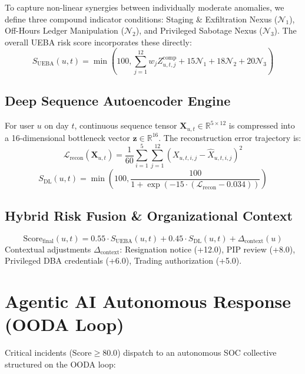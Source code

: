 \documentclass[conference]{IEEEtran}
\begin{document}
To capture non-linear synergies between individually moderate anomalies, we define three compound indicator conditions: Staging \& Exfiltration Nexus ($\mathcal{N}_1$), Off-Hours Ledger Manipulation ($\mathcal{N}_2$), and Privileged Sabotage Nexus ($\mathcal{N}_3$). The overall UEBA risk score incorporates these directly:
\begin{equation}
S_{\text{UEBA}}(u, t) = \min\left(100, \sum_{j=1}^{12} w_j Z_{u, t, j}^{\text{comp}} + 15\mathcal{N}_1 + 18\mathcal{N}_2 + 20\mathcal{N}_3\right)
\end{equation}

\subsection{Deep Sequence Autoencoder Engine}
For user $u$ on day $t$, continuous sequence tensor $\mathbf{X}_{u, t} \in \mathbb{R}^{5 \times 12}$ is compressed into a 16-dimensional bottleneck vector $\mathbf{z} \in \mathbb{R}^{16}$. The reconstruction error trajectory is:
\begin{equation}
\mathcal{L}_{\text{recon}}(\mathbf{X}_{u, t}) = \frac{1}{60} \sum_{i=1}^5 \sum_{j=1}^{12} (X_{u, t, i, j} - \widehat{X}_{u, t, i, j})^2
\end{equation}
\begin{equation}
S_{\text{DL}}(u, t) = \min\left(100, \frac{100}{1 + \exp\left(-15 \cdot (\mathcal{L}_{\text{recon}} - 0.034)\right)}\right)
\end{equation}

\subsection{Hybrid Risk Fusion \& Organizational Context}
\begin{equation}
\text{Score}_{\text{final}}(u, t) = 0.55 \cdot S_{\text{UEBA}}(u, t) + 0.45 \cdot S_{\text{DL}}(u, t) + \Delta_{\text{context}}(u)
\end{equation}
Contextual adjustments $\Delta_{\text{context}}$: Resignation notice (+12.0), PIP review (+8.0), Privileged DBA credentials (+6.0), Trading authorization (+5.0).

\section{Agentic AI Autonomous Response (OODA Loop)}
Critical incidents ($\text{Score} \ge 80.0$) dispatch to an autonomous SOC collective structured on the OODA loop:
\end{document}
